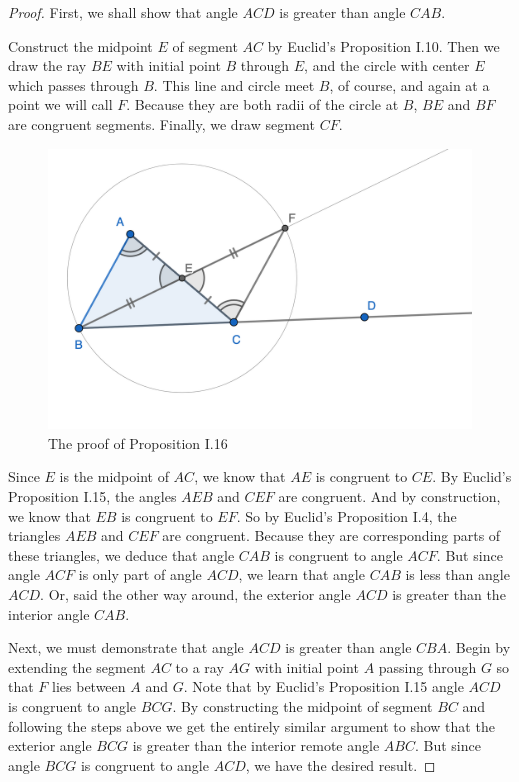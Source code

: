 \documentclass[12pt]{article}
\begin{document}
\begin{proof}
First, we shall show that angle $ACD$ is greater than angle $CAB$.

Construct the midpoint $E$ of segment $AC$ by Euclid's Proposition I.10. Then we draw the ray $BE$ with initial point $B$ through $E$, and the circle with center $E$ which passes through $B$. This line and circle meet $B$, of course, and again at a point we will call $F$. Because they are both radii of the circle at $B$, $BE$ and $BF$ are congruent segments. Finally, we draw segment $CF$.

\begin{figure}[ht]
\centering
\includegraphics[width=.5\textwidth]{example3.png}
\caption{The proof of Proposition I.16}
\end{figure}

Since $E$ is the midpoint of $AC$, we know that $AE$ is congruent to $CE$. By Euclid's Proposition I.15, the angles $AEB$ and $CEF$ are congruent. And by construction, we know that $EB$ is congruent to $EF$. So by Euclid's Proposition I.4, the triangles $AEB$ and $CEF$ are congruent. Because they are corresponding parts of these triangles, we deduce that angle $CAB$ is congruent to angle $ACF$. But since angle $ACF$ is only part of angle $ACD$, we learn that angle $CAB$ is less than angle $ACD$. Or, said the other way around, the exterior angle $ACD$ is greater than the interior angle $CAB$.

Next, we must demonstrate that angle $ACD$ is greater than angle $CBA$. Begin by extending the segment $AC$ to a ray $AG$ with initial point $A$ passing through $G$ so that $F$ lies between $A$ and $G$. Note that by Euclid's Proposition I.15 angle $ACD$ is congruent to angle $BCG$. By constructing the midpoint of segment $BC$ and following the steps above we get the entirely similar argument to show that the exterior angle $BCG$ is greater than the interior remote angle $ABC$.
But since angle $BCG$ is congruent to angle $ACD$, we have the desired result.

\end{proof}
 
 
\end{document}
